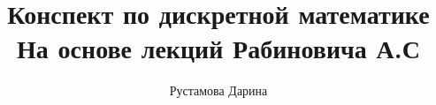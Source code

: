 \documentclass[12pt]{report}
\title{
    Конспект по дискретной математике \\ 
    \large На основе лекций Рабиновича А.С}
\author{
    Рустамова Дарина
}
\date{\the\year}
\begin{document}
\maketitle
\tableofcontents

\newcommand\shortlorem{}

\newpage












\shortlorem
\end{document}
